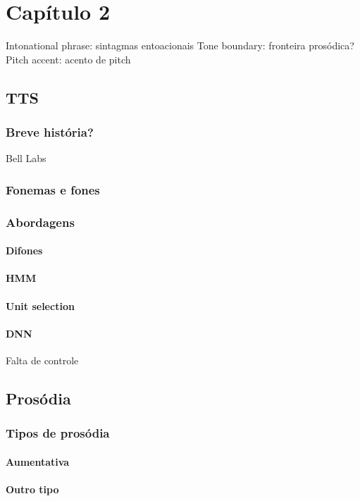 \chapter{Capítulo 2}

Intonational phrase: sintagmas entoacionais
Tone boundary: fronteira prosódica?
Pitch accent: acento de pitch

\section{TTS}
\subsection{Breve história?}
Bell Labs
\subsection{Fonemas e fones}
\subsection{Abordagens}
\subsubsection{Difones}
\subsubsection{HMM}
\subsubsection{Unit selection}
\subsubsection{DNN}
Falta de controle
\section{Prosódia}
\subsection{Tipos de prosódia}
\subsubsection{Aumentativa}
\subsubsection{Outro tipo}
